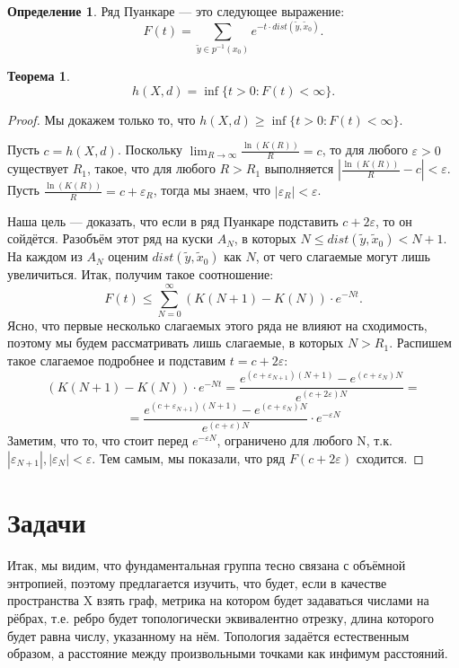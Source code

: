 \documentclass[11pt]{article}
\theoremstyle{definition}
\newtheorem{defin}{Определение}%
\theoremstyle{plain}
\theoremstyle{plain}
\newtheorem{theorem}{Теорема}
\def\leq{\leqslant}
\def\geq{\geqslant}
\def\wt#1{\widetilde{#1}}
\def\eps{\varepsilon}
\begin{document}
\begin{defin}
Ряд Пуанкаре --- это следующее выражение:
$$
  F(t) = \sum_{\wt{y} \in p^{-1}(x_0)} e^{-t \cdot dist(\wt{y}, \wt{x}_0)}.
$$
\end{defin}

\begin{theorem}\label{t_puank}
$$
h(X,d) = \inf \{t>0: F(t) < \infty\}.
$$
\end{theorem}

\begin{proof} Мы докажем только то, что $h(X,d) \geq \inf \{t>0: F(t) < \infty\}$.

Пусть $c = h(X, d)$. Поскольку $\lim_{R \rightarrow \infty} \frac{\ln (K(R))} {R} = c$, то для любого $\eps > 0$ 
существует $R_1$, такое, что для любого $R > R_1$ выполняется $\left|\frac{\ln (K(R))} {R} - c\right| < \eps$.
Пусть $\frac{\ln (K(R))} {R} = c + \eps_R$, тогда мы знаем, что $|\eps_R| < \eps$.

Наша цель --- доказать, что если в ряд Пуанкаре подставить $c + 2\eps$, то он сойдётся.
Разобъём этот ряд на куски $A_N$, в которых $N \leq dist(\wt{y}, \wt{x}_0) < N+1$. На каждом из $A_N$ оценим $dist(\wt{y}, \wt{x}_0)$ как $N$, 
от чего слагаемые могут лишь увеличиться. Итак, получим такое соотношение:
$$
F(t) \leq \sum_{N=0}^{\infty} (K(N+1)-K(N))\cdot e^{-Nt}.
$$
Ясно, что первые несколько слагаемых этого ряда не влияют на сходимость, поэтому мы будем рассматривать лишь слагаемые, в которых $N > R_1$.
Распишем такое слагаемое подробнее и подставим $t = c + 2\eps$:
$$
(K(N+1)-K(N))\cdot e^{-Nt} = \frac{e^{(c + \eps_{N+1})(N+1)} - e^{(c + \eps_{N})N}}  {e^{(c+2\eps)N}} = 
$$
$$
= \frac{e^{(c + \eps_{N+1})(N+1)} - e^{(c + \eps_{N})N}}  {e^{(c+\eps)N}} \cdot e^{-\eps N}
$$
Заметим, что то, что стоит перед $e^{-\eps N}$, ограничено для любого N, т.к. $|\eps_{N+1}|, |\eps_{N}| < \eps$. 
Тем самым, мы показали, что ряд $F(c+2\eps)$ сходится.





\end{proof}

\section{Задачи}
Итак, мы видим, что фундаментальная группа тесно связана с объёмной энтропией, поэтому предлагается изучить, что будет, 
если в качестве пространства X взять граф, метрика на котором будет задаваться числами на рёбрах, 
т.е. ребро будет топологически эквивалентно отрезку, 
длина которого будет равна числу, указанному на нём. 
Топология задаётся естественным образом, а расстояние между произвольными точками как инфимум расстояний.
\end{document}

